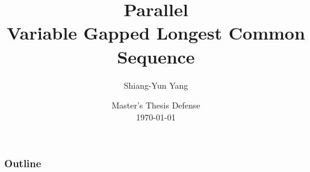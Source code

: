 \documentclass{beamer}
\title{Parallel \\ Variable Gapped Longest Common Sequence}
\author{Shiang-Yun Yang}
\institute{Department of Computer Science \& Information Engineering\\
National Taiwan University}
\date{Master's Thesis Defense\\\today}
\begin{document}
\begin{frame}
    \titlepage
\end{frame}

\begin{frame}
    \frametitle{Outline}
    \tableofcontents[hideallsubsections]
\end{frame}






%
\end{document}

